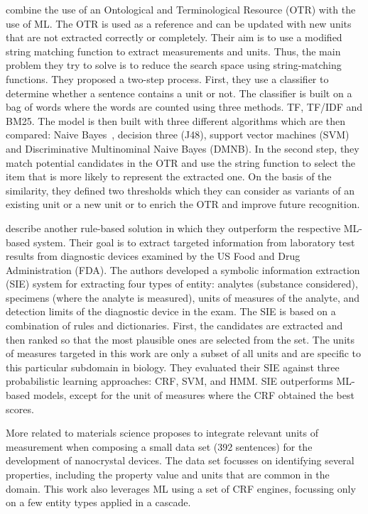 \cite{berrahou2013extract} combine the use of an Ontological and
Terminological Resource (OTR) with the use of ML.
The OTR is used as a reference and can be updated with new units that are not extracted correctly or completely. 
Their aim is to use a modified string matching function to extract measurements and units. Thus, the main problem they try to solve is to reduce the search space using string-matching functions. 
They proposed a two-step process. 
First, they use a classifier to determine whether a sentence contains a unit or not. The classifier is built on a bag of words where the words are counted using three methods. TF, TF/IDF and BM25. The model is then built with three different algorithms which are then compared: Naive Bayes~\cite{john2013estimating}, decision three (J48), support vector machines (SVM) and Discriminative Multinominal Naive Bayes (DMNB).
In the second step, they match potential candidates in the OTR and use the string function to select the item that is more likely to represent the extracted one. On the basis of the similarity, they defined two thresholds which they can consider as variants of an existing unit or a new unit or to enrich the OTR and improve future recognition.

\cite{kang_extracting_2013} describe another rule-based solution in which they outperform the respective ML-based system. 
Their goal is to extract targeted information from laboratory test results from diagnostic devices examined by the US Food and Drug Administration (FDA). 
The authors developed a symbolic information extraction (SIE) system for extracting four types of entity: analytes (substance considered), specimens (where the analyte is measured), units of measures of the analyte, and detection limits of the diagnostic device in the exam.
The SIE is based on a combination of rules and dictionaries. First, the candidates are extracted and then ranked so that the most plausible ones are selected from the set. The units of measures targeted in this work are only a subset of all units and are specific to this particular subdomain in biology. 
They evaluated their SIE against three probabilistic learning approaches: CRF, SVM, and HMM. SIE outperforms ML-based models, except for the unit of measures where the CRF obtained the best scores. 

More related to materials science \cite{dieb2015framework} proposes to integrate relevant units of measurement when composing a small data set (392 sentences) for the development of nanocrystal devices. 
The data set focusses on identifying several properties, including the property value and units that are common in the domain. 
This work also leverages ML using a set of CRF engines, focussing only on a few entity types applied in a cascade. 

